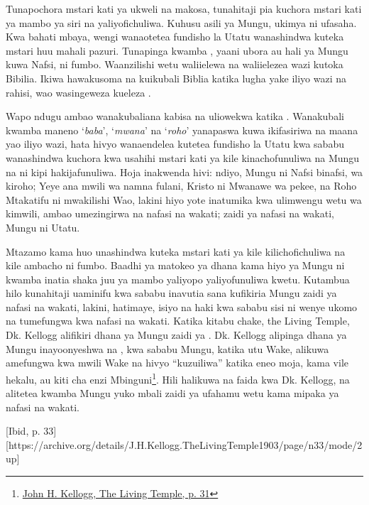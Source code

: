 Tunapochora mstari kati ya ukweli na makosa, tunahitaji pia kuchora mstari kati ya mambo ya siri na yaliyofichuliwa. Kuhusu asili ya Mungu, ukimya ni ufasaha. Kwa bahati mbaya, wengi wanaotetea fundisho la Utatu wanashindwa kuteka mstari huu mahali pazuri. Tunapinga kwamba , yaani ubora au hali ya Mungu kuwa Nafsi, ni fumbo. Waanzilishi wetu waliielewa na waliielezea wazi kutoka Bibilia. Ikiwa hawakusoma na kuikubali Biblia katika lugha yake iliyo wazi na rahisi, wao wasingeweza kueleza .

Wapo ndugu ambao wanakubaliana kabisa na  uliowekwa katika . Wanakubali kwamba maneno ‘\textit{baba}’, ‘\textit{mwana}’ na ‘\textit{roho}’ yanapaswa kuwa ikifasiriwa na maana yao iliyo wazi, hata hivyo wanaendelea kutetea fundisho la Utatu kwa sababu wanashindwa kuchora kwa usahihi mstari kati ya kile kinachofunuliwa na Mungu na ni kipi hakijafunuliwa. Hoja inakwenda hivi: ndiyo, Mungu ni Nafsi binafsi, wa kiroho; Yeye ana mwili wa namna fulani, Kristo ni Mwanawe wa pekee, na Roho Mtakatifu ni mwakilishi Wao, lakini hiyo yote inatumika kwa ulimwengu wetu wa kimwili, ambao umezingirwa na nafasi na wakati; zaidi ya nafasi na wakati, Mungu ni Utatu.

Mtazamo kama huo unashindwa kuteka mstari kati ya kile kilichofichuliwa na kile ambacho ni fumbo. Baadhi ya matokeo ya dhana kama hiyo ya Mungu ni kwamba inatia shaka juu ya mambo yaliyopo yaliyofunuliwa kwetu. Kutambua hilo kunahitaji uaminifu kwa sababu inavutia sana kufikiria Mungu zaidi ya nafasi na wakati, lakini, hatimaye, isiyo na haki kwa sababu sisi ni wenye ukomo na tumefungwa kwa nafasi na wakati. Katika kitabu chake, the Living Temple, Dk. Kellogg alifikiri dhana ya Mungu zaidi ya . Dk. Kellogg alipinga dhana ya Mungu inayoonyeshwa na , kwa sababu Mungu, katika utu Wake, alikuwa amefungwa kwa mwili Wake na hivyo “kuzuiliwa” katika eneo moja, kama vile hekalu, au kiti cha enzi Mbinguni\footnote{\href{https://archive.org/details/J.H.Kellogg.TheLivingTemple1903/page/n31/mode/2up}{John H. Kellogg, The Living Temple, p. 31}}. Hili halikuwa na faida kwa Dk. Kellogg, na alitetea kwamba Mungu yuko mbali zaidi ya ufahamu wetu kama mipaka ya nafasi na wakati.

[Ibid, p. 33][https://archive.org/details/J.H.Kellogg.TheLivingTemple1903/page/n33/mode/2up]

